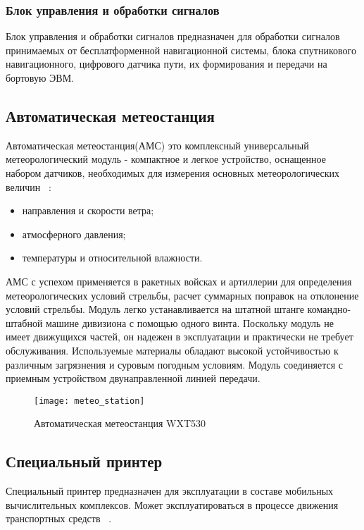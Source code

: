 \subsubsection{Блок управления и обработки сигналов}
\label{sub:lit_review:ins:bos}
Блок управления и обработки сигналов предназначен для обработки сигналов принимаемых от бесплатформенной
навигационной системы, блока спутникового навигационного, цифрового датчика пути, их
формирования и передачи на бортовую ЭВМ.

\subsection{Автоматическая метеостанция}
\label{sub:lit_review:meteo}

Автоматическая метеостанция(АМС) это комплексный универсальный метеорологический модуль - компактное и легкое
устройство, оснащенное набором датчиков, необходимых для измерения основных метеорологических величин ~\cite{wxt530}:
\begin{itemize}
	\item направления и скорости ветра;
	\item атмосферного давления;
	\item температуры и относительной влажности.
\end{itemize}

АМС с успехом применяется в ракетных войсках и артиллерии для определения метеорологических условий стрельбы, расчет суммарных поправок на отклонение условий стрельбы.
Модуль легко устанавливается на штатной штанге командно-штабной машине дивизиона с помощью одного винта.
Поскольку модуль не имеет движущихся частей, он надежен в эксплуатации и практически не требует обслуживания.
Используемые материалы обладают высокой устойчивостью к различным загрязнения и суровым погодным условиям.
Модуль соединяется с приемным устройством двунаправленной линией передачи.

\begin{figure}
	\centering
	\texttt{[image: meteo\_station]}
	\caption{Автоматическая метеостанция WXT530~\cite{wxt530}}
	\label{fig:lit_reiview:meteo:meteo_station}
\end{figure}

\subsection{Специальный принтер}
\label{sub:lit_review:spec_printer}
Специальный принтер предназначен для эксплуатации в составе мобильных вычислительных комплексов.
Может эксплуатироваться в процессе движения транспортных средств ~\cite{mp2200}.


